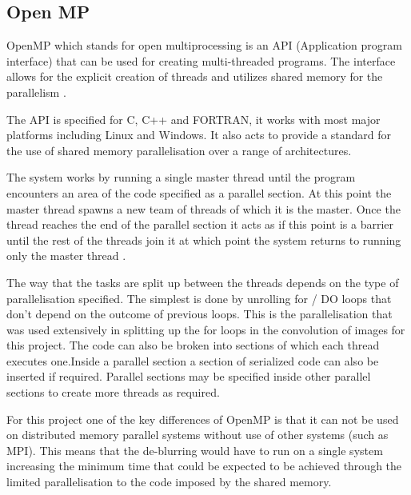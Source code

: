 \subsection*{Open MP}
OpenMP which stands for open multiprocessing is an API (Application program interface) that can be used for creating multi-threaded programs. The interface allows for the explicit creation of threads and utilizes shared memory for the parallelism \cite{omp}.

The API is specified for C, C++ and FORTRAN, it works with most major platforms including Linux and Windows. It also acts to provide a standard for the use of shared memory parallelisation over a range of architectures.

The system works by running a single master thread until the program encounters an area of the code specified as a parallel section. At this point the master thread spawns a new team of threads of which it is the master. Once the thread reaches the end of the parallel section it acts as if this point is a barrier until the rest of the threads join it at which point the system returns to running only the master thread \cite{omp}. 

The way that the tasks are split up between the threads depends on the type of parallelisation specified. The simplest is done by unrolling for / DO loops that don’t depend on the outcome of previous loops. This is the parallelisation that was used extensively in splitting up the for loops in the convolution of images for this project. The code can also be broken into sections of which each thread executes one.Inside a parallel section a section of serialized code can also be inserted if required. Parallel sections may be specified inside other parallel sections to create more threads as required.

For this project one of the key differences of OpenMP is that it can not be used on distributed memory parallel systems without use of other systems (such as MPI). This means that the de-blurring would have to run on a single system increasing the minimum time that could be expected to be achieved through the limited parallelisation to the code imposed by the shared memory.